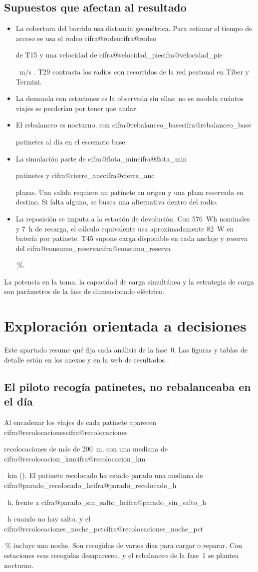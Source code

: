 \documentclass[11pt,a4paper]{article}
\makeatletter
\newcommand\cifra[1]{\ifcsname cifra@#1\endcsname\csname cifra@#1\endcsname
  \else\PackageError{memoria}{Cifra desconocida: \detokenize{#1}}{Revisa generar_cifras.py}\fi}
\newcommand\pc{\,\%}
\makeatother
\begin{document}
\subsection{Supuestos que afectan al resultado}
\begin{itemize}
  \item La cobertura del barrido usa distancia geométrica. Para estimar el tiempo
        de acceso se usa el rodeo \cifra{rodeo} de T15 y una velocidad de
        \cifra{velocidad_pie}~m/s \cite{bohannon2011}. T29 contrasta los radios con
        recorridos de la red peatonal en Tíber y Termini.
  \item La demanda con estaciones es la observada sin ellas; no se modela cuántos viajes se
        perderían por tener que andar.
  \item El rebalanceo es nocturno, con \cifra{rebalanceo_base} patinetes al día en el
        escenario base.
  \item La simulación parte de \cifra{flota_min} patinetes y \cifra{cierre_anc}
        plazas. Una salida requiere un patinete en origen y una plaza reservada en
        destino. Si falta alguno, se busca una alternativa dentro del radio.
  \item La reposición se imputa a la estación de devolución. Con 576~Wh
        nominales y 7~h de recarga, el cálculo equivalente usa aproximadamente
        82~W en batería por patinete. T45 supone carga disponible en cada
        anclaje y reserva del \cifra{consumo_reserva}\pc{}.
\end{itemize}
La potencia en la toma, la capacidad de carga simultánea y la estrategia de
carga son parámetros de la fase de dimensionado eléctrico.

\section{Exploración orientada a decisiones}\label{sec:exploracion}
Este apartado resume qué fija cada análisis de la fase~0. Las figuras y tablas de detalle
están en los anexos y en la web de resultados \cite{web}.

\subsection{El piloto recogía patinetes, no rebalanceaba en el día}
Al encadenar los viajes de cada patinete aparecen \cifra{recolocaciones} recolocaciones de más
de 200~m, con una mediana de \cifra{recolocacion_km}~km
(). El patinete recolocado ha estado parado una
mediana de \cifra{parado_recolocado_h}~h, frente a \cifra{parado_sin_salto_h}~h cuando no hay
salto, y el \cifra{recolocaciones_noche_pct}\pc{} incluye una noche. Son recogidas de varios
días para cargar o reparar. Con estaciones esas recogidas desaparecen, y el rebalanceo de la
fase~1 se plantea nocturno.
\end{document}
